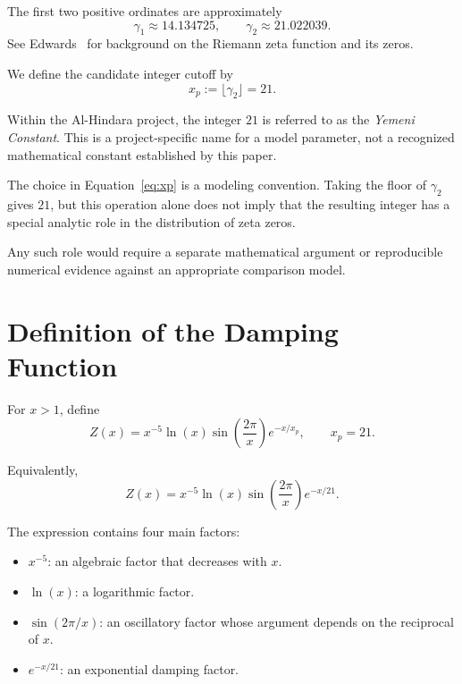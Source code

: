 \documentclass[11pt,a4paper]{article}
\begin{document}
The first two positive ordinates are approximately
\[
\gamma_1\approx14.134725,
\qquad
\gamma_2\approx21.022039.
\]
See Edwards~\cite{edwards1974} for background on the
Riemann zeta function and its zeros.

We define the candidate integer cutoff by
\begin{equation}
x_p:=\lfloor\gamma_2\rfloor=21.
\label{eq:xp}
\end{equation}

Within the Al-Hindara project, the integer \(21\) is referred
to as the \textit{Yemeni Constant}. This is a project-specific
name for a model parameter, not a recognized mathematical
constant established by this paper.

The choice in Equation~\eqref{eq:xp} is a modeling convention.
Taking the floor of \(\gamma_2\) gives \(21\), but this operation
alone does not imply that the resulting integer has a special
analytic role in the distribution of zeta zeros.

Any such role would require a separate mathematical argument
or reproducible numerical evidence against an appropriate
comparison model.

\section{Definition of the Damping Function}

For \(x>1\), define
\begin{equation}
Z(x)=x^{-5}\ln(x)
\sin\left(\frac{2\pi}{x}\right)e^{-x/x_p},
\qquad x_p=21.
\label{eq:field}
\end{equation}

Equivalently,
\begin{equation}
Z(x)=x^{-5}\ln(x)
\sin\left(\frac{2\pi}{x}\right)e^{-x/21}.
\label{eq:field_expanded}
\end{equation}

The expression contains four main factors:

\begin{itemize}
\item \(x^{-5}\): an algebraic factor that decreases with \(x\).
\item \(\ln(x)\): a logarithmic factor.
\item \(\sin(2\pi/x)\): an oscillatory factor whose argument
depends on the reciprocal of \(x\).
\item \(e^{-x/21}\): an exponential damping factor.
\end{itemize}
\end{document}
